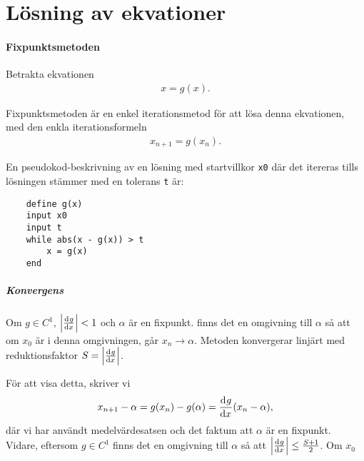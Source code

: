 \section{Lösning av ekvationer}

\paragraph{Fixpunktsmetoden}
Betrakta ekvationen
\begin{align*}
	x = g(x).
\end{align*}

Fixpunktsmetoden är en enkel iterationsmetod för att lösa denna ekvationen, med den enkla iterationsformeln
\begin{align*}
	x_{n + 1} = g(x_{n}).
\end{align*}

En pseudokod-beskrivning av en lösning med startvillkor \verb|x0| där det itereras tills lösningen stämmer med en tolerans \verb|t| är:
\begin{lstlisting}
	define g(x)
	input x0
	input t
	while abs(x - g(x)) > t
		x = g(x)
	end
\end{lstlisting}

\subparagraph{Konvergens}
Om $g\in C^{1}$, $\abs{\dv[]{g}{x} (\alpha)} < 1$ och $\alpha$ är en fixpunkt. finns det en omgivning till $\alpha$ så att om $x_{0}$ är i denna omgivningen, går $x_{n}\to\alpha$. Metoden konvergerar linjärt med reduktionsfaktor $S = \abs{\dv[]{g}{x} (\alpha)}$.

För att visa detta, skriver vi
\begin{align*}
	x_{n + 1} - \alpha = g(x_{n}) - g(\alpha) = \dv[]{g}{x} (c)(x_{n} - \alpha),
\end{align*}
där vi har användt medelvärdesatsen och det faktum att $\alpha$ är en fixpunkt. Vidare, eftersom $g\in C^{1}$ finns det en omgivning till $\alpha$ så att $\abs{\dv[]{g}{x} (x)}\leq \frac{S + 1}{2}$. Om $x_{0}$
